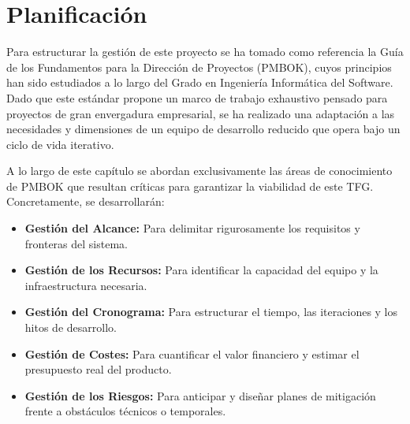 \chapter{Planificación}

\sloppy

\begin{abstract}
En este capítulo se expone la planificación temporal del proyecto, estructurada mediante la metodología ágil definida previamente. Se detalla el cronograma de ejecución a través de hitos mensuales y \textit{Sprints} semanales, abarcando desde la configuración inicial de la arquitectura hasta el despliegue final del sistema. Asimismo, se establecen las métricas de trazabilidad y las políticas de mitigación adoptadas por el equipo para absorber futuras desviaciones y garantizar el cumplimiento de los plazos.
\end{abstract}

Para estructurar la gestión de este proyecto se ha tomado como referencia la Guía de los Fundamentos para la Dirección de Proyectos (PMBOK), cuyos principios han sido estudiados a lo largo del Grado en Ingeniería Informática del Software. Dado que este estándar propone un marco de trabajo exhaustivo pensado para proyectos de gran envergadura empresarial, se ha realizado una adaptación a las necesidades y dimensiones de un equipo de desarrollo reducido que opera bajo un ciclo de vida iterativo.

A lo largo de este capítulo se abordan exclusivamente las áreas de conocimiento de PMBOK que resultan críticas para garantizar la viabilidad de este TFG. Concretamente, se desarrollarán:
\begin{itemize}
    \item \textbf{Gestión del Alcance:} Para delimitar rigurosamente los requisitos y fronteras del sistema.
    \item \textbf{Gestión de los Recursos:} Para identificar la capacidad del equipo y la infraestructura necesaria.
    \item \textbf{Gestión del Cronograma:} Para estructurar el tiempo, las iteraciones y los hitos de desarrollo.
    \item \textbf{Gestión de Costes:} Para cuantificar el valor financiero y estimar el presupuesto real del producto.
    \item \textbf{Gestión de los Riesgos:} Para anticipar y diseñar planes de mitigación frente a obstáculos técnicos o temporales.
\end{itemize}

